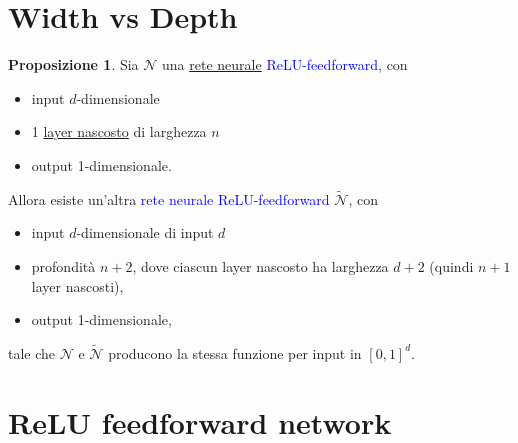\documentclass[10pt]{book}
\newcommand{\1}{\mathds{1}}
\renewcommand{\tilde}[1]{\widetilde{#1}}
\theoremstyle{definition}%
\newtheorem{prop}[thm]{Proposizione}
\theoremstyle{plain}
\theoremstyle{remark}
\renewcommand{\href}[2]{\textcolor{blue}{#2}}
\begin{document}
\section{Width vs Depth}
\label{sec:org3b6e97f}

\begin{prop}
Sia \(\mathcal{N}\) una \hyperref[sec:org599fe74]{rete neurale} \href{../../../../../org/roam/20250624155858-neurone_artificiale.org}{ReLU-feedforward}, con
\begin{itemize}
\item input \(d\)-dimensionale
\item 1 \hyperref[sec:org5035087]{layer nascosto} di larghezza \(n\)
\item output 1-dimensionale.
\end{itemize}

Allora esiste un'altra \href{../../../../../org/roam/20250624155858-neurone_artificiale.org}{rete neurale ReLU-feedforward} \(\tilde{\mathcal{N}}\), con
\begin{itemize}
\item input \(d\)-dimensionale di input \(d\)
\item profondità \(n+2\), dove ciascun layer nascosto ha larghezza \(d+2\) (quindi \(n+1\) layer nascosti),
\item output 1-dimensionale,
\end{itemize}
tale che \(\mathcal{N}\) e \(\tilde{\mathcal{N}}\) producono la stessa funzione per input in \([0,1]^{d}\).
\label{prop10.2.5}
\end{prop}
\section{ReLU feedforward network}
\label{sec:org5229134}
\end{document}
